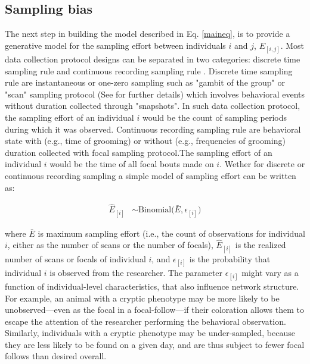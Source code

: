\documentclass[Afour,sageh,times]{sagej}
\begin{document}
\subsection{Sampling bias}
The next step in building the model described in Eq. \ref{maineq}, is to provide a generative model for the sampling effort between individuals $i$ and $j$, $E_{[i,j]}$. Most data collection protocol designs can be separated in two categories: discrete time sampling rule and continuous recording sampling rule \citep{bateson2021measuring}. Discrete time sampling rule are instantaneous or one-zero sampling such as "gambit of the group" or "scan" sampling protocol (See \citet{sosa2021reliable} for further details) which involves behavioral events without duration collected through "snapshots". In such data collection protocol, the sampling effort of an individual $i$ would be the count of sampling periods during which it was observed. Continuous recording sampling rule are behavioral state with (e.g., time of grooming) or without (e.g., frequencies of grooming) duration collected with focal sampling protocol.The sampling effort of an individual $i$ would be the time of all focal bouts made on $i$. Wether for discrete or continuous recording sampling a simple model of sampling effort can be written as:

\begin{ceqn}
\begin{align}\label{eq2}
	\hat E_{[i]} &\sim \mathrm{Binomial}\Big(\bar E, \epsilon_{[i]} \Big)
\end{align}
\end{ceqn}

where $\bar E$ is maximum sampling effort (i.e., the count of observations for individual $i$, either as the number of scans or the number of focals), $\hat E_{[i]}$ is the realized number of scans or focals of individual $i$, and $\epsilon_{[i]}$ is the probability that individual $i$ is observed from the researcher. The parameter $\epsilon_{[i]}$ might vary as a function of individual-level characteristics, that also influence network structure. For example, an animal with a cryptic phenotype may be more likely to be unobserved---even as the focal in a focal-follow---if their coloration allows them to escape the attention of the researcher performing the behavioral observation. Similarly, individuals with a cryptic phenotype may be under-sampled, because they are less likely to be found on a given day, and are thus subject to fewer focal follows than desired overall. 
\end{document}
